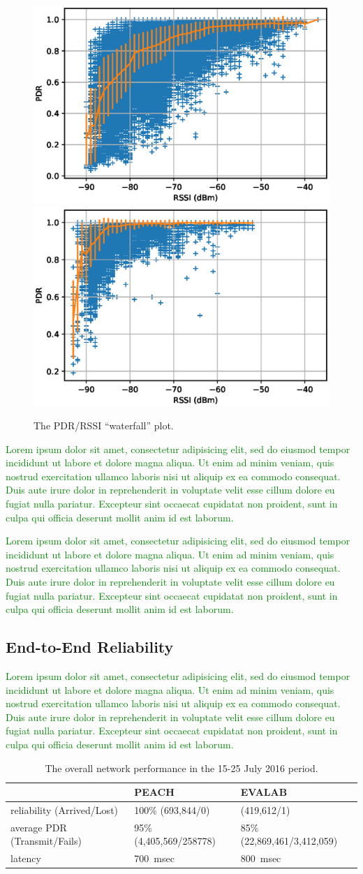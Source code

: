 \documentclass{elsarticle}
\newcommand{\lorem}          {\textcolor{green}{Lorem ipsum dolor sit amet, consectetur adipisicing elit, sed do eiusmod tempor incididunt ut labore et dolore magna aliqua. Ut enim ad minim veniam, quis nostrud exercitation ullamco laboris nisi ut aliquip ex ea commodo consequat. Duis aute irure dolor in reprehenderit in voluptate velit esse cillum dolore eu fugiat nulla pariatur. Excepteur sint occaecat cupidatat non proident, sunt in culpa qui officia deserunt mollit anim id est laborum.}}
\begin{document}
\begin{figure}
    \includegraphics[width=0.5\columnwidth]{waterfall.eps}
    \includegraphics[width=0.5\columnwidth]{waterfall_peach.eps}  
    \caption{
        The PDR/RSSI ``waterfall'' plot.
    }
    \label{fig:waterfall}
\end{figure}

\lorem


\lorem

\subsection{End-to-End Reliability}
\label{sec:net_reliability}


\lorem

\begin{table}
    \begin{tabular}{|l|l|l|}
        \hline
        {}	 							& PEACH 				  & EVALAB \\
        \hline
        reliability (Arrived/Lost) 		& 100\% (693,844/0) 	  & (419,612/1)\\ \hline
        average PDR (Transmit/Fails) 	& 95\% (4,405,569/258778) & 85\% (22,869,461/3,412,059)\\ \hline
        latency     					& 700~msec 				  & 800~msec\\
        \hline
    \end{tabular}
    \caption{The overall network performance in the 15-25 July 2016 period.}
    \label{tab:net_stats_peach}
\end{table}
\end{document}
